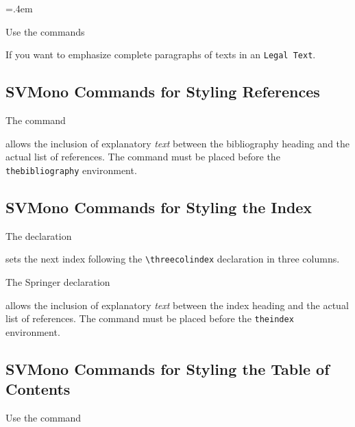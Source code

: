\documentclass[graybox,square]{svmono}
\begin{document}
\begin{sloppy}
\eject

\parskip=.4em

Use the commands

\cprotect{}

If you want to emphasize complete paragraphs of texts in an \verb|Legal Text|.  

\subsection{SVMono Commands for Styling References}

The command

\cprotect{}

allows the inclusion of explanatory {\it text} between the bibliography heading and the actual list of references. The command must be placed before the \verb|thebibliography| environment.

\subsection{SVMono Commands for Styling the Index}

The declaration

\cprotect\boxtext{\verb|\threecolindex|}

sets the next index following the \verb|\threecolindex| declaration in three columns.

The Springer declaration

\cprotect{}

allows the inclusion of explanatory {\it text} between the index heading and the actual list of references. The command must be placed before the \verb|theindex| environment.


\subsection{SVMono Commands for Styling the Table of Contents}

Use the command


\end{sloppy}
\end{document}
